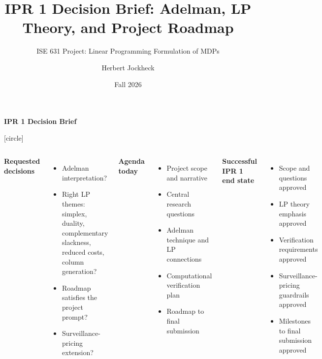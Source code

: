 \documentclass[aspectratio=169,11pt]{beamer}
\title[IPR 1 Decision Brief]{IPR 1 Decision Brief: Adelman, LP Theory, and Project Roadmap}
\subtitle{ISE 631 Project: Linear Programming Formulation of MDPs}
\author{Herbert Jockheck}
\date{Fall 2026}
\begin{document}
{%
\begin{frame}[plain,t]
\noindent\fontsize{14}{16}\selectfont\textbf{IPR 1 Decision Brief}\par
\vspace{0.35em}

\fontsize{12}{14}\selectfont
{}
[circle]

\begin{center}
\end{center}

\vspace{0.45em}
\begin{columns}[T,onlytextwidth]
\raggedright
\textbf{Requested decisions}
\begin{itemize}
    \setlength\itemsep{0em}
    \item Adelman interpretation?
    \item Right LP themes: simplex, duality, complementary slackness, reduced costs, column generation?
    \item Roadmap satisfies the project prompt?
    \item Surveillance-pricing extension?
\end{itemize}

\raggedright
\textbf{Agenda today}
\begin{itemize}
    \setlength\itemsep{0em}
    \item Project scope and narrative
    \item Central research questions
    \item Adelman technique and LP connections
    \item Computational verification plan
    \item Roadmap to final submission
\end{itemize}

\raggedright
\textbf{Successful IPR 1 end state}
\begin{itemize}
    \setlength\itemsep{0em}
    \item Scope and questions approved
    \item LP theory emphasis approved
    \item Verification requirements approved
    \item Surveillance-pricing guardrails approved
    \item Milestones to final submission approved
\end{itemize}
\end{columns}
\end{frame}
}
\end{document}
